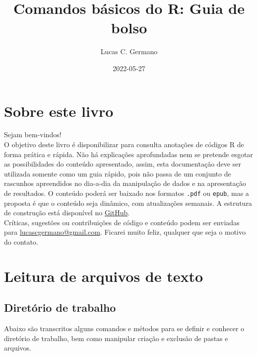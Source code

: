 \documentclass[
]{book}
\title{Comandos básicos do R: Guia de bolso}
\author{Lucas C. Germano}
\date{2022-05-27}
\theoremstyle{definition}
\theoremstyle{definition}
\theoremstyle{definition}
\theoremstyle{definition}
\theoremstyle{remark}
\begin{document}
\maketitle

{
\setcounter{tocdepth}{1}
\tableofcontents
}
\hypertarget{sobre-este-livro}{%
\chapter*{Sobre este livro}\label{sobre-este-livro}}

Sejam bem-vindos!\\
O objetivo deste livro é disponibilizar para consulta anotações de códigos R de forma prática e rápida. Não há explicações aprofundadas nem se pretende esgotar as possibilidades do conteúdo apresentado, assim, esta documentação deve ser utilizada somente como um guia rápido, pois não passa de um conjunto de rascunhos apreendidos no dia-a-dia da manipulação de dados e na apresentação de resultados. O conteúdo poderá ser baixado nos formatos \texttt{.pdf} ou \texttt{epub}, mas a proposta é que o conteúdo seja dinâmico, com atualizações semanais. A estrutura de construção está disponível no \href{https://github.com/lucascgmermano/guia_de_bolso.git}{GitHub}.\\
Críticas, sugestões ou contribuições de código e conteúdo podem ser enviadas para \url{lucascgermano@gmail.com}. Ficarei muito feliz, qualquer que seja o motivo do contato.

\hypertarget{leitura-de-arquivos-de-texto}{%
\chapter{Leitura de arquivos de texto}\label{leitura-de-arquivos-de-texto}}

\hypertarget{diretuxf3rio-de-trabalho}{%
\section{Diretório de trabalho}\label{diretuxf3rio-de-trabalho}}

Abaixo são transcritos alguns comandos e métodos para se definir e conhecer o diretório de trabalho, bem como manipular criação e exclusão de pastas e arquivos.
\end{document}
